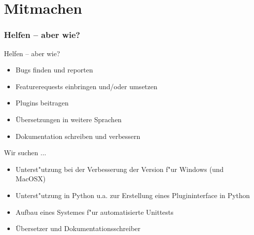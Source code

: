 \section{Mitmachen}
\begin{frame}
	\frametitle{Helfen -- aber wie?}
	\begin{block}{Helfen -- aber wie?}
		\begin{itemize}
			\item Bugs finden und reporten
			\item Featurerequests einbringen und/oder umsetzen
			\item Plugins beitragen
			\item Übersetzungen in weitere Sprachen
			\item Dokumentation schreiben und verbessern
		\end{itemize}
	\end{block}
	\pause
	\begin{block}{Wir suchen ... }
		\begin{itemize}
			\item Unterst"utzung bei der Verbesserung der Version f"ur
				  Windows (und MacOSX)
			\pause
			\item Unterst"utzung in Python u.a. zur Erstellung eines
				  Plugininterface in Python
			\pause
			\item Aufbau eines Systemes f"ur automatisierte Unittests
			\pause
			\item Übersetzer und Dokumentationsschreiber	
		\end{itemize}
	\end{block}
\end{frame}

